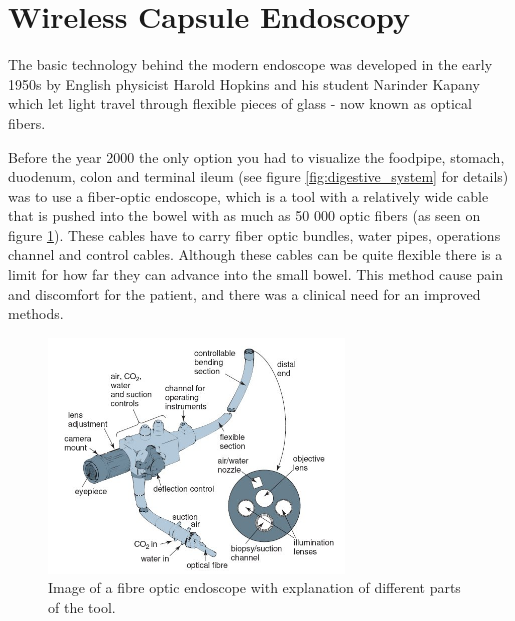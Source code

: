 \documentclass[english, a4paper]{report}
\begin{document}
\section{Wireless Capsule Endoscopy}  \label{wireless_capsule_endoscopy}
The basic technology behind the modern endoscope was developed in the early 1950s by English physicist Harold Hopkins and his student Narinder Kapany which let light travel through flexible pieces of glass - now known as optical fibers. \cite{NewMethod54}

Before the year 2000 the only option you had to visualize the foodpipe, stomach, duodenum, colon and terminal ileum (see figure \ref{fig:digestive_system} for details) was to use a fiber-optic endoscope, which is a tool with a relatively wide cable that is pushed into the bowel with as much as 50 000 optic fibers (as seen on figure \ref{fig:fiber-optic-endoscopy}). These cables have to carry fiber optic bundles, water pipes, operations channel and control cables. Although these cables can be quite flexible there is a limit for how far they can advance into the small bowel. This method cause pain and discomfort for the patient, and there was a clinical need for an improved methods.

\begin{figure} %
  \begin{center}
    \includegraphics[width=0.7\textwidth]{fiber-optic-endoscope.jpg}
    \caption{Image of a fibre optic endoscope with explanation of different parts of the tool. \cite{MedicalPhysics}}
    \label{fig:fiber-optic-endoscopy}
  \end{center}
\end{figure}
\end{document}
